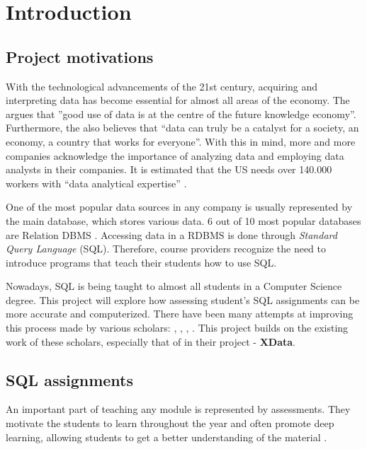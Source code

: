\chapter{Introduction} \label{ch:introduction}
\section{Project motivations}
With the technological advancements of the 21st century, acquiring and interpreting
data has become essential for almost all areas of the economy. The \cite{ec:big_data} argues that ''good use of data is at
the centre of the future knowledge economy''.
Furthermore, the \cite{gov:big_data} also believes that ``data can truly be a catalyst for a society, an economy, a country that works for everyone''. With this in mind, more and more companies acknowledge the importance of analyzing data and employing data analysts in their companies. It is estimated that the US needs over 140.000 workers with ``data analytical expertise'' \citep{Lohr2012}.

One of the most popular data sources in any company is usually represented by the main database, which stores various data. 6 out of 10 most popular databases are Relation DBMS \citep{db_engine:statistics}.
Accessing data in a RDBMS is done through \textit{Standard Query Language}
(SQL). Therefore, course providers recognize the need to introduce programs that teach their students how to use SQL.

Nowadays, SQL is being taught to almost all students in a Computer Science
degree. This project will explore how assessing student's SQL
assignments can be more accurate and computerized. There have been many attempts at improving this process made by various scholars: \cite{literature:activesql}, \cite{literature:assesql},
\cite{literature:sqlify}, \cite{literature:xdata}. This project builds on the existing work of these scholars, especially that of \cite{literature:xdata} in their project - \textbf{XData}.

\section{SQL assignments} \label{ch:introduction:assignments}

An important part of teaching any module is represented by assessments. They motivate the students to learn throughout the year and often promote deep learning, allowing students to get a better understanding of the material \citep{literature:assement}.

